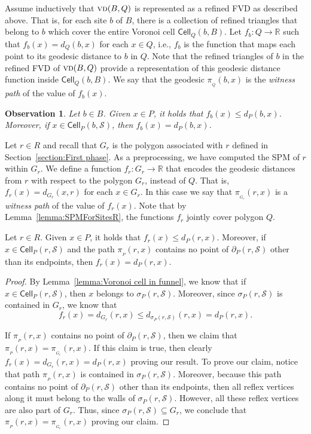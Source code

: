\documentclass[a4paper,UKenglish]{socg-lipics-v2018}
\newtheorem{observation}[theorem]{Observation}
\newcommand{\s}{\mathcal S}
\newcommand{\dd}[3][P]{\ensuremath{d_{#1}(#2, #3)}}
\newcommand{\p}[3][P]{\ensuremath{\pi_{_{#1}}(#2, #3)}}
\newcommand{\funnel}[2][P]{\ensuremath{\sigma_{\scriptscriptstyle #1}(#2)}}
\newcommand{\cell}[2][P]{\ensuremath{\mathsf{Cell}_{\scriptscriptstyle #1}(#2)}}
\newcommand{\bcell}[2][P]{\ensuremath{\partial_{\scriptscriptstyle #1}(#2)}}
\newcommand{\vd}[2][P]{\textsc{vd}(#2, #1)}
\begin{document}
Assume inductively that $\vd[Q]{B}$ is represented as a refined FVD as described above.
That is, for each site $b$ of $B$, there is a collection of refined triangles that belong to $b$ which cover the entire Voronoi cell $\cell[Q]{b, B}$. 
Let $f_b:Q \to \mathbb{R}$ such that $f_b(x) = \dd[Q]{b}{x}$ for each $x\in Q$, i.e., $f_b$ is the function that maps each point to its geodesic distance to $b$ in $Q$. 
Note that the refined triangles of $b$ in the refined FVD of $\vd[Q]{B}$ provide a representation of this geodesic distance function inside $\cell[Q]{b, B}$.
We say that the geodesic $\p[Q]{b}{x}$ is the \emph{witness path} of the value of $f_b(x)$.

\begin{observation}\label{obs: f_s and distance coincide in cell}
Let $b\in B$.
Given $x\in P$, it holds that $f_b(x) \leq \dd{b}{x}$. Moreover, if $x\in \cell{b, \s}$, then $f_b(x) = \dd{b}{x}$. 
\end{observation}

Let $r\in R$ and recall that $G_r$ is the polygon associated with $r$ defined in Section~\ref{section:First phase}. 
As a preprocessing, we have computed the SPM of $r$ within $G_r$.
We define a function $f_r:G_r\to \mathbb{R}$ that encodes the geodesic distances from $r$ with respect to the polygon $G_r$, instead of $Q$. 
That is, $f_r(x) = \dd[G_r]{x}{r}$ for each $x\in G_r$.
In this case we say that $\p[G_r]{r}{x}$ is a \emph{witness path} of the value of $f_r(x)$. 
Note that by Lemma~\ref{lemma:SPMForSitesR}, the functions $f_r$ jointly cover polygon $Q$. 

\begin{lemma}\label{lemma: f_r and distance coincide in cell}
Let $r\in R$.
Given $x\in P$, it holds that $f_r(x) \leq \dd{r}{x}$. Moreover, if $x\in \cell{r, \s}$ and the path $\p{r}{x}$ contains no point of $\bcell{r, \s}$ other than its endpoints, then $f_r(x) = \dd{r}{x}$. 
\end{lemma}
\begin{proof}
By Lemma~\ref{lemma:Voronoi cell in funnel}, we know that if $x\in \cell{r,\s}$, then  $x$ belongs to $\funnel{r, \s}$.
Moreover, since $\funnel{r, \s}$ is contained in $G_r$, we know that 
\[ f_r(x) = \dd[G_r]{r}{x} \leq \dd[\funnel{r, \s}]{r}{x} = \dd{r}{x}.\]

If $\p{r}{x}$ contains no point of $\bcell{r, \s}$, then we claim that $\p{r}{x} = \p[G_r]{r}{x}$. 
If this claim is true, then clearly $f_r(x) = \dd[G_r]{r}{x} = \dd{r}{x}$ proving our result.
To prove our claim, notice that path $\p{r}{x}$ is contained in $\funnel{r, \s}$. Moreover, because this path contains no point of $\bcell{r, \s}$ other than its endpoints, then all reflex vertices along it must belong to the walls of $\funnel{r, \s}$. However, all these reflex vertices are also part of $G_r$. Thus, since $\funnel{r, \s}\subseteq G_r$, we conclude that $\p{r}{x} = \p[G_r]{r}{x}$ proving our claim.  
\end{proof}
\end{document}

